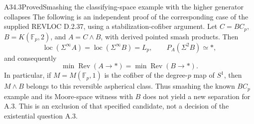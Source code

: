 \begin{claim}{A34.3}{Proved}{Smashing the classifying-space example with the higher generator collapses}\label{A343}
The following is an independent proof of the corresponding case of
the supplied REVLOC D.2.37, using a stabilization-cofiber argument.
Let $C=BC_p$, $B=K(\mathbb F_p,2)$, and $A=C\wedge B$, with
derived pointed smash products.  Then
\[
 \operatorname{loc}(\Sigma^\infty A)
   =\operatorname{loc}(\Sigma^\infty B)=L_p,
 \qquad
 P_A(\Sigma^2B)\simeq *,
 \tag{A34.3.1}
\]
and consequently
\[
 \min\operatorname{Rev}(A\to *)
   =\min\operatorname{Rev}(B\to *).
 \tag{A34.3.2}
\]
In particular, if $M=M(\mathbb F_p,1)$ is the cofiber of the
degree-$p$ map of $S^1$, then $M\wedge B$ belongs to this reversible
aspherical class.  Thus smashing the known $BC_p$ example and its
Moore-space witness with $B$ does not yield a new separation for A.3.
This is an exclusion of that specified candidate, not a decision of
the existential question A.3.
\end{claim}
